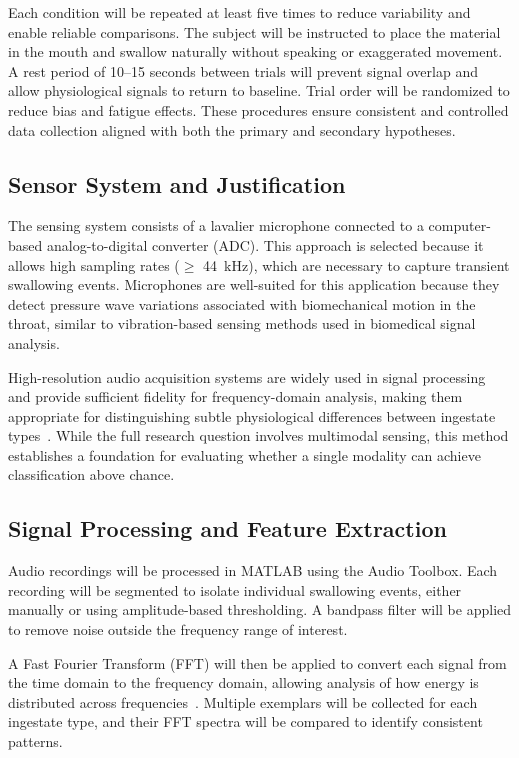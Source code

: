 \documentclass[10pt,conference]{IEEEtran}
\begin{document}
Each condition will be repeated at least five times to reduce variability and enable reliable comparisons. The subject will be instructed to place the material in the mouth and swallow naturally without speaking or exaggerated movement. A rest period of 10--15 seconds between trials will prevent signal overlap and allow physiological signals to return to baseline. Trial order will be randomized to reduce bias and fatigue effects. These procedures ensure consistent and controlled data collection aligned with both the primary and secondary hypotheses.

\subsection{Sensor System and Justification}
The sensing system consists of a lavalier microphone connected to a computer-based analog-to-digital converter (ADC). This approach is selected because it allows high sampling rates ($\ge$ 44~kHz), which are necessary to capture transient swallowing events. Microphones are well-suited for this application because they detect pressure wave variations associated with biomechanical motion in the throat, similar to vibration-based sensing methods used in biomedical signal analysis.

High-resolution audio acquisition systems are widely used in signal processing and provide sufficient fidelity for frequency-domain analysis, making them appropriate for distinguishing subtle physiological differences between ingestate types~\cite{freq_chart,nyquist,adc}. While the full research question involves multimodal sensing, this method establishes a foundation for evaluating whether a single modality can achieve classification above chance.

\subsection{Signal Processing and Feature Extraction}
Audio recordings will be processed in MATLAB using the Audio Toolbox. Each recording will be segmented to isolate individual swallowing events, either manually or using amplitude-based thresholding. A bandpass filter will be applied to remove noise outside the frequency range of interest.

A Fast Fourier Transform (FFT) will then be applied to convert each signal from the time domain to the frequency domain, allowing analysis of how energy is distributed across frequencies~\cite{adc}. Multiple exemplars will be collected for each ingestate type, and their FFT spectra will be compared to identify consistent patterns.
\end{document}
